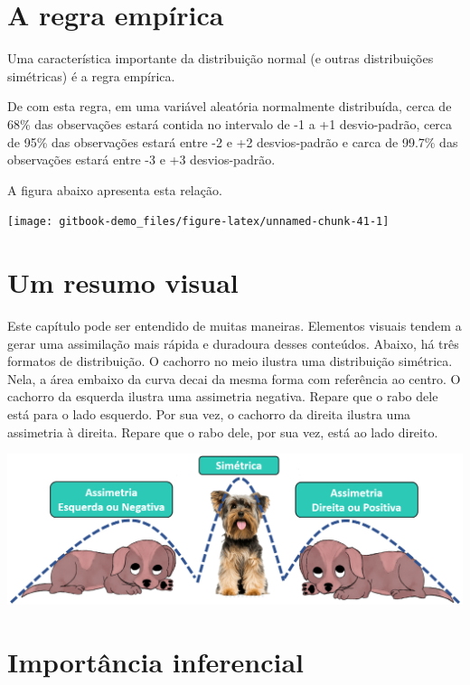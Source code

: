 \documentclass[
]{book}
\begin{document}
\hypertarget{a-regra-empuxedrica}{%
\section{A regra empírica}\label{a-regra-empuxedrica}}

Uma característica importante da distribuição normal (e outras distribuições simétricas) é a regra empírica.

De com esta regra, em uma variável aleatória normalmente distribuída, cerca de 68\% das observações estará contida no intervalo de -1 a +1 desvio-padrão, cerca de 95\% das observações estará entre -2 e +2 desvios-padrão e carca de 99.7\% das observações estará entre -3 e +3 desvios-padrão.

A figura abaixo apresenta esta relação.

\begin{center}\texttt{[image: gitbook-demo\_files/figure-latex/unnamed-chunk-41-1]} \end{center}

\hypertarget{um-resumo-visual}{%
\section{Um resumo visual}\label{um-resumo-visual}}

Este capítulo pode ser entendido de muitas maneiras. Elementos visuais tendem a gerar uma assimilação mais rápida e duradoura desses conteúdos. Abaixo, há três formatos de distribuição. O cachorro no meio ilustra uma distribuição simétrica. Nela, a área embaixo da curva decai da mesma forma com referência ao centro. O cachorro da esquerda ilustra uma assimetria negativa. Repare que o rabo dele está para o lado esquerdo. Por sua vez, o cachorro da direita ilustra uma assimetria à direita. Repare que o rabo dele, por sua vez, está ao lado direito.

\includegraphics{./img/cap_desc_assimetria.png}

\hypertarget{importuxe2ncia-inferencial}{%
\section{Importância inferencial}\label{importuxe2ncia-inferencial}}
\end{document}
